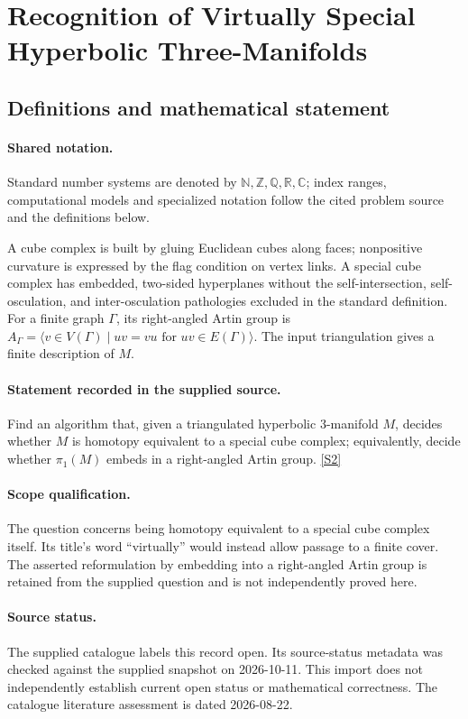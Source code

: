 \documentclass[11pt]{article}
\newcommand{\sref}[2]{\hyperlink{source:#1:#2}{[S#2]}}
\begin{document}
\section{Recognition of Virtually Special Hyperbolic Three-Manifolds}\label{statement}

\subsection{Definitions and mathematical statement}

\paragraph{Shared notation.}Standard number systems are denoted by $\mathbb N,\mathbb Z,\mathbb Q,\mathbb R,\mathbb C$; index ranges, computational models and specialized notation follow the cited problem source and the definitions below.


A cube complex is built by gluing Euclidean cubes along faces; nonpositive curvature is expressed by the flag condition on vertex links. A special cube complex has embedded, two-sided hyperplanes without the self-intersection, self-osculation, and inter-osculation pathologies excluded in the standard definition. For a finite graph $\Gamma$, its right-angled Artin group is $A_\Gamma=\langle v\in V(\Gamma)\mid uv=vu\text{ for }uv\in E(\Gamma)\rangle$. The input triangulation gives a finite description of $M$.
\paragraph{Statement recorded in the supplied source.}
Find an algorithm that, given a triangulated hyperbolic $3$-manifold $M$, decides whether $M$ is homotopy equivalent to a special cube complex; equivalently, decide whether $\pi_1(M)$ embeds in a right-angled Artin group. \sref{statement}{2}
\paragraph{Scope qualification.}
The question concerns being homotopy equivalent to a special cube complex itself. Its title's word ``virtually'' would instead allow passage to a finite cover. The asserted reformulation by embedding into a right-angled Artin group is retained from the supplied question and is not independently proved here.
\paragraph{Source status.}
The supplied catalogue labels this record open. Its source-status metadata was checked against the supplied snapshot on 2026-10-11. This import does not independently establish current open status or mathematical correctness. The catalogue literature assessment is dated 2026-08-22.
\end{document}
